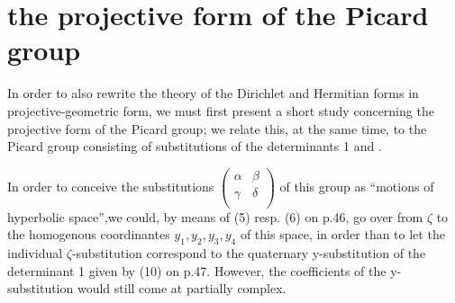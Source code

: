 \section{the projective form of the Picard group}

In order to also rewrite the theory of the Dirichlet and Hermitian forms in projective-geometric form, we must first present a short study concerning the projective form of the Picard group; we relate this, at the same time, to the Picard group consisting of substitutions of the determinants 1 and \ii.

In order to conceive the substitutions $\left(\begin{array}{cc}\alpha&\beta\\\gamma&\delta\\\end{array}\right)$ of this group as “motions of hyperbolic space”,we could, by means of (5) resp. (6) on p.46, go over from $\zeta$ to the homogenous coordinantes $y_1,y_2,y_3,y_4$ of this space, in order than to let the individual $\zeta$-substitution correspond to the quaternary y-substitution of the determinant 1 given by (10) on p.47. However, the coefficients of the y-substitution would still come at partially complex.

